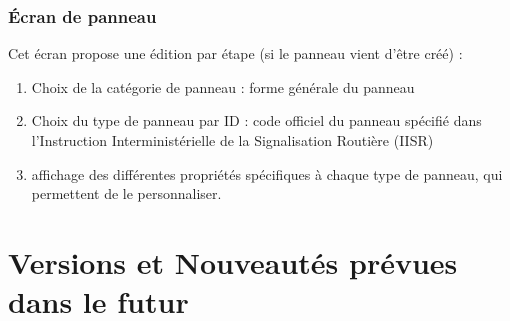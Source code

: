 \documentclass[a4paper, 12pt]{report}
\begin{document}
\subsection{Écran de panneau}
Cet écran propose une édition par étape (si le panneau vient d'être créé) :
\begin{enumerate}
	\item Choix de la catégorie de panneau : forme générale du panneau
	\item Choix du type de panneau par ID : code officiel du panneau spécifié dans l'Instruction Interministérielle de la Signalisation Routière (IISR)
	\item affichage des différentes propriétés spécifiques à chaque type de panneau, qui permettent de le personnaliser.
\end{enumerate}

\chapter[versions et idées]{Versions et Nouveautés prévues dans le futur}
\end{document}
